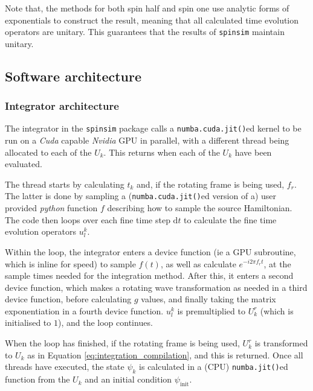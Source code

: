 \documentclass{jors}
\begin{document}
			Note that, the methods for both spin half and spin one use analytic forms of exponentials to construct the result, meaning that all calculated time evolution operators are unitary. This guarantees that the results of \texttt{spinsim} maintain unitary. 

	\subsection*{Software architecture}
		\subsubsection*{Integrator architecture}
			The integrator in the \texttt{spinsim} package calls a \texttt{numba.cuda.jit()}ed kernel to be run on a \emph{Cuda} capable \emph{Nvidia} GPU in parallel, with a different thread being allocated to each of the \(U_k\). This returns when each of the \(U_k\) have been evaluated.
			
			The thread starts by calculating \(t_k\) and, if the rotating frame is being used, \(f_r\). The latter is done by sampling a (\texttt{numba.cuda.jit()}ed version of a) user provided \emph{python} function \(f\) describing how to sample the source Hamiltonian. The code then loops over each fine time step \(\mathrm{d}t\) to calculate the fine time evolution operators \(u^k_l\).
			
			Within the loop, the integrator enters a device function (ie a GPU subroutine, which is inline for speed) to sample \(f(t)\), as well as calculate \(e^{-i 2 \pi f_r t}\), at the sample times needed for the integration method. After this, it enters a second device function, which makes a rotating wave transformation as needed in a third device function, before calculating \(g\) values, and finally taking the matrix exponentiation in a fourth device function. \(u^k_l\) is premultiplied to \(U^r_k\) (which is initialised to \(1\)), and the loop continues.
			
			When the loop has finished, if the rotating frame is being used, \(U^r_k\) is transformed to \(U_k\) as in Equation \eqref{eq:integration_compilation}, and this is returned. Once all threads have executed, the state \(\psi_k\) is calculated in a (CPU) \texttt{numba.jit()}ed function from the \(U_k\) and an initial condition \(\psi_{\mathrm{init}}\).
	
	
\end{document}
